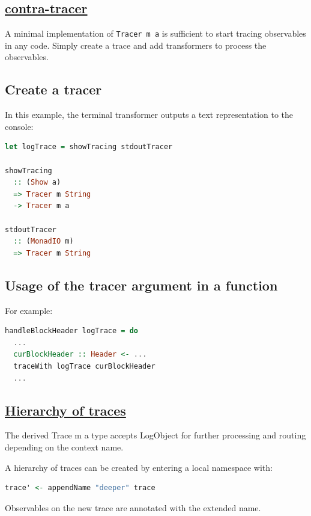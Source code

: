 \begin{mdframed}
    \section*{\href{https://github.com/input-output-hk/iohk-monitoring-framework/tree/master/contra-tracer}{contra-tracer}}

    A minimal implementation of \texttt{Tracer m a} is sufficient to start tracing observables in any code. Simply create a trace and add transformers to process the observables.

    \subsection*{Create a tracer}

    In this example, the terminal transformer outputs a text representation to the console:

    \begin{lstlisting}[language=Haskell]
let logTrace = showTracing stdoutTracer

showTracing
  :: (Show a)
  => Tracer m String
  -> Tracer m a

stdoutTracer
  :: (MonadIO m)
  => Tracer m String
    \end{lstlisting}

    \subsection*{Usage of the tracer argument in a function}

    For example:

    \begin{lstlisting}[language=Haskell]
handleBlockHeader logTrace = do
  ...
  curBlockHeader :: Header <- ...
  traceWith logTrace curBlockHeader
  ...
    \end{lstlisting}
\end{mdframed}

\begin{mdframed}
    \section*{\href{https://github.com/input-output-hk/iohk-monitoring-framework/blob/master/iohk-monitoring/src/Cardano/BM/Trace.lhs}{Hierarchy of traces}}

    The derived Trace m a type accepts LogObject for further processing and routing depending on the context name.

    A hierarchy of traces can be created by entering a local namespace with:

    \begin{lstlisting}[language=Haskell]
trace' <- appendName "deeper" trace
    \end{lstlisting}

    Observables on the new trace are annotated with the extended name.
\end{mdframed}

